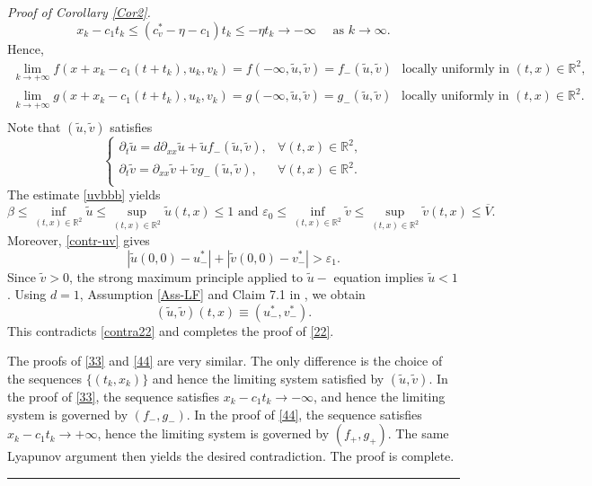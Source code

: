 \documentclass[10pt]{article}
\numberwithin{equation}{section}
\newcommand{\R}{\mathbb{R}}
\newenvironment{proof}[1][Proof]{\noindent\textit{#1.} }{\hfill \rule{0.5em}{0.5em}}
\begin{document}
\begin{proof}[Proof of Corollary \ref{Cor2}]
    \[
    x_k-c_1t_k\le (c_v^*-\eta-c_1)t_k\le -\eta t_k\to-\infty  \quad \text{ as  } k \to \infty.
    \]
 Hence, 
  \begin{equation*}
  \begin{aligned}
   \lim_{k\to +\infty } f(x+x_k- c_1(t+t_k), u_k, v_k) = f( -\infty, \tilde{u}, \tilde{v})= f_{-}(\tilde{u}, \tilde{v}) ~~  \text{ locally uniformly in } (t,x) \in \R^2,\\
    \lim_{k\to +\infty } g(x+x_k- c_1(t+t_k), u_k, v_k) =g( -\infty, \tilde{u}, \tilde{v}) =g_{-}(\tilde{u}, \tilde{v})  ~~ \text{ locally uniformly in } (t,x) \in \R^2.\\
  \end{aligned}
  \end{equation*}
  Note that  $(\tilde{u}, \tilde{v})$ satisfies
\begin{equation*}
\begin{cases}
\partial_t \tilde{u}= d \partial_{xx} \tilde{u}  +  \tilde{u} f_{-} \left(   \tilde{u},  \tilde{v}\right),   & \forall (t,x) \in \R^2, \\
\partial_t \tilde{v}=  \partial_{xx} \tilde{v} + \tilde{v} g_{-} \left(   \tilde{u},  \tilde{v}\right),  & \forall (t,x) \in \R^2. \\
\end{cases}
\end{equation*}
The estimate  \eqref{uvbbb} yields 
\begin{equation*}
\beta \leq  \inf_{(t,x) \in \R^2} \tilde{u} \leq \sup_{(t,x) \in \R^2}  \tilde{u}(t,x)  \leq 1 \text{  and  }    \varepsilon_0 \leq  \inf_{(t,x) \in \R^2} \tilde{v} \leq \sup_{(t,x) \in \R^2}  \tilde{v}(t,x)  \leq \overline{V}.
\end{equation*}  
Moreover,  \eqref{contr-uv}  gives
\begin{equation}\label{contra22}
\left| \tilde{u}(0, 0)-u^*_{-}  \right| + \left| \tilde{v}(0, 0) - v^*_{-}\right|   >\varepsilon_1. 
\end{equation}
Since $\tilde{v} >0$, the strong maximum principle applied to  $\tilde{u}-$ equation implies $\tilde{u}<1$.  
Using  $d=1$, Assumption \ref{Ass-LF} and  Claim 7.1 in \cite{ducrot2019spreading}, we obtain
\begin{equation}\label{eq-lya}
 (\tilde{u}, \tilde{v}) (t,x) \equiv  (u^*_{-}, v^*_{-}).  
\end{equation}
This  contradicts  \eqref{contra22}   and   completes the proof of  \eqref{22}.



The proofs of \eqref{33} and \eqref{44} are very similar.  The only difference is the choice of the  sequences $\{(t_k, x_k)\}$ and hence the limiting system satisfied by $(\tilde{u}, \tilde{v})$.     
In the proof of  \eqref{33}, the sequence satisfies
\(x_k-c_1t_k\to-\infty\), and hence the limiting system is governed by \((f_-,g_-)\).
In the proof of \eqref{44}, the sequence satisfies
\(x_k-c_1t_k\to+\infty\), hence the limiting system is governed by  \((f_+,g_+)\).
The same Lyapunov argument then yields the desired contradiction.
The proof is complete.




\end{proof}
\end{document}

